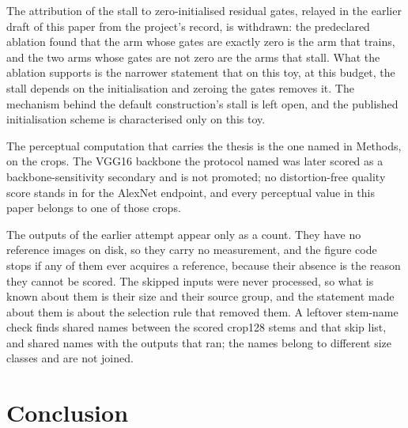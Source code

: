 The attribution of the stall to zero-initialised residual gates, relayed in the
earlier draft of this paper from the project's record, is withdrawn: the
predeclared ablation found that the arm whose gates are exactly zero is the arm
that trains, and the two arms whose gates are not zero are the arms that stall.
What the ablation supports is the narrower statement that on this toy, at this
budget, the stall depends on the initialisation and zeroing the gates removes
it. The mechanism behind the default construction's stall is left open, and the
published initialisation scheme is characterised only on this toy.

The perceptual computation that carries the thesis is the one named in
Methods, on the \SubsetN{} crops. The VGG16 backbone the protocol named was
later scored as a backbone-sensitivity secondary and is not promoted; no
distortion-free quality score stands in for the AlexNet endpoint, and every
perceptual value in this paper belongs to one of those crops.

The \CensusRan{} outputs of the earlier attempt appear only as a count. They
have no reference images on disk, so they carry no measurement, and the figure
code stops if any of them ever acquires a reference, because their absence is
the reason they cannot be scored. The \CensusSkipped{} skipped inputs were
never processed, so what is known about them is their size and their source
group, and the statement made about them is about the selection rule that
removed them. A leftover stem-name check finds \CensusNameOverlap{} shared
names between the scored crop128 stems and that skip list, and
\CensusNameOverlapRan{} shared names with the outputs that ran; the names
belong to different size classes and are not joined.

\section{Conclusion}

